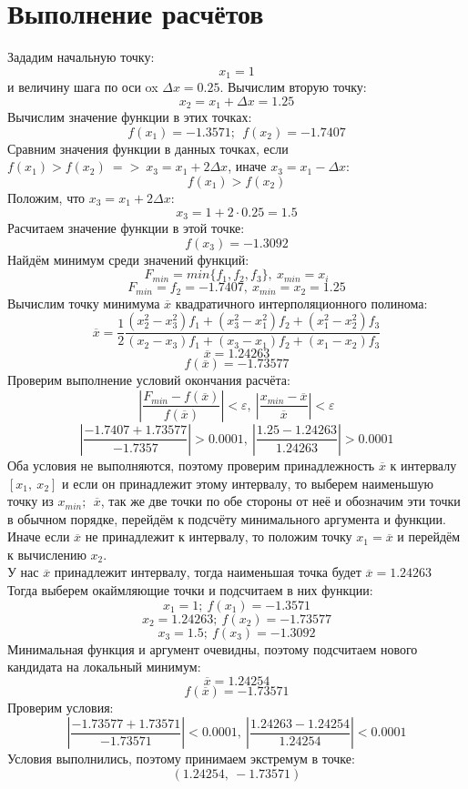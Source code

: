 \documentclass{article}
\begin{document}
\section{Выполнение расчётов}
Зададим начальную точку: \[x_1 =1\] и величину шага по оси ox $\Delta x = 0.25$. 
Вычислим вторую точку: \[x_2 = x_1+\Delta x = 1.25\]
Вычислим значение функции в этих точках: \[f(x_1) = -1.3571; \ \ f(x_2) = -1.7407\]
Сравним значения функции в данных точках, если $f(x_1) > f(x_2) \ =>\ x_3 = x_1 +2\Delta x$, иначе $x_3 = x_1-\Delta x$: 
\[f(x_1) > f(x_2)\]
Положим, что $x_3 = x_1 +2\Delta x$:
\[x_3 = 1 + 2\cdot 0.25 = 1.5\]
Расчитаем значение функции в этой точке:
\[f(x_3) = -1.3092\]
Найдём минимум среди значений функций:
\[F_{min} = min\{f_1,f_2,f_3\},\ x_{min} = x_i\]
\[F_{min} = f_2 = -1.7407,\ x_{min} = x_2 = 1.25\]
Вычислим точку минимума $\overline{x}$ квадратичного интерполяционного полинома:
\[\overline{x} = \frac{1}{2} \frac{(x_2^2-x_3^2)f_1 + (x_3^2-x_1^2)f_2+(x_1^2-x_2^2)f_3}{(x_2-x_3)f_1+(x_3-x_1)f_2+(x_1-x_2)f_3}\]
\[\overline{x} = 1.24263\]
\[f(\overline{x}) = -1.73577\]
Проверим выполнение условий окончания расчёта:
\[\left|\frac{F_{min}-f(\overline{x})}{f(\overline{x})}\right|<\varepsilon,\ \left|\frac{x_{min}-\overline{x}}{\overline{x}}\right|<\varepsilon\]
\[\left|\frac{-1.7407+1.73577}{-1.7357}\right|>0.0001,\ \left|\frac{1.25-1.24263}{1.24263}\right|>0.0001\]
Оба условия не выполняются, поэтому проверим принадлежность $\overline{x}$ к интервалу $[x_1,\ x_2]$ и если он принадлежит этому интервалу, то выберем наименьшую точку из $x_{min};\ \ \overline{x}$, так же две точки по обе стороны от неё и обозначим эти точки в обычном порядке, перейдём к подсчёту минимального аргумента и функции. Иначе если $\overline{x}$  не принадлежит к интервалу, то положим точку $x_1 = \overline{x}$ и перейдём к вычислению $x_2$.
\\
У нас $\overline{x}$ принадлежит интервалу, тогда наименьшая точка будет $\overline{x} = 1.24263$
\\
Тогда выберем окаймляющие точки и подсчитаем в них функции:
\[x_1 = 1;\ f(x_1) = -1.3571\]
\[x_2 = 1.24263;\ f(x_2) = -1.73577\]
\[x_3 = 1.5;\ f(x_3) = -1.3092\]
Минимальная функция и  аргумент очевидны, поэтому подсчитаем нового кандидата на локальный минимум:
\[\overline{x} = 1.24254\]
\[f(\overline{x}) = -1.73571\]
Проверим условия:
\[\left|\frac{-1.73577+1.73571}{-1.73571}\right|<0.0001,\ \left|\frac{1.24263-1.24254}{1.24254}\right|<0.0001\]
Условия выполнились, поэтому принимаем экстремум в точке:
\[(1.24254,\ -1.73571)\]
\end{document}
